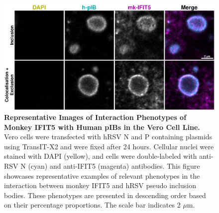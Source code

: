 \begin{figure}
    \centering
    \includegraphics[width=1\linewidth]{09. Chapter 4/Figs/01. pIB/05. IFIT5/03. i5-vero-hnhp.pdf}
    \caption[Representative Images of Interaction Phenotypes of Monkey IFIT5 with Human pIBs in the Vero Cell Line.]{\textbf{Representative Images of Interaction Phenotypes of Monkey IFIT5 with Human pIBs in the Vero Cell Line.} Vero cells were transfected with hRSV N and P containing plasmids using TransIT-X2 and were fixed after 24 hours. Cellular nuclei were stained with DAPI (yellow), and cells were double-labeled with anti-RSV N (cyan) and anti-IFIT5 (magenta) antibodies. This figure showcases representative examples of relevant phenotypes in the interaction between monkey IFIT5 and hRSV pseudo inclusion bodies. These phenotypes are presented in descending order based on their percentage proportions. The scale bar indicates 2 \(\mu \mbox{m}\).}
    \label{fig:Representative Images of Interaction Phenotypes of Monkey IFIT5 with Human pIBs in the VERO Cell Line}
\end{figure}

